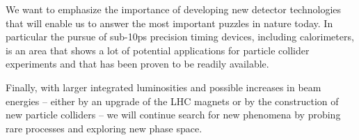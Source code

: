 We want to emphasize the importance of developing new detector
technologies that will enable us to answer the most important puzzles
in nature today. In particular the pursue of sub-10\unit{ps} precision timing devices,
including calorimeters, is an area that shows a lot of potential
applications for particle collider experiments and that has been
proven to be readily available.

Finally, with larger integrated luminosities and possible increases in
beam energies -- either by an upgrade of the LHC magnets or by the
construction of new particle colliders -- we will continue search for
new phenomena by probing rare processes and exploring new phase space.
